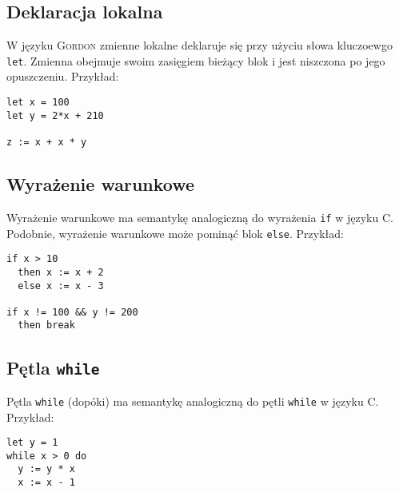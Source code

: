 \documentclass{documentation}
\begin{document}
\subsection{Deklaracja lokalna}
W języku \textsc{Gordon} zmienne lokalne deklaruje się przy użyciu słowa kluczoewgo
\texttt{let}. Zmienna obejmuje swoim zasięgiem bieżący blok i jest niszczona po
jego opuszczeniu. Przykład:

\begin{verbatim}
let x = 100
let y = 2*x + 210

z := x + x * y
\end{verbatim}

\subsection{Wyrażenie warunkowe}
Wyrażenie warunkowe ma semantykę analogiczną do wyrażenia \texttt{if}
w języku \textsc{C}. Podobnie, wyrażenie warunkowe może pominąć blok \texttt{else}.
Przykład:

\begin{verbatim}
if x > 10
  then x := x + 2
  else x := x - 3

if x != 100 && y != 200
  then break
\end{verbatim}

\subsection{Pętla \texttt{while}}
Pętla \texttt{while} (dopóki) ma semantykę analogiczną do pętli \texttt{while} w języku
\textsc{C}. Przykład:

\begin{verbatim}
let y = 1
while x > 0 do
  y := y * x
  x := x - 1
\end{verbatim}
\end{document}
